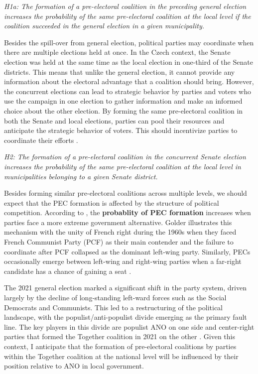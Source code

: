\documentclass[]{interact}
\theoremstyle{plain}%
\theoremstyle{definition}
\theoremstyle{remark}
\begin{document}
\vspace{12pt}
\textit{H1a: The formation of a pre-electoral coalition in the preceding general election increases the probability of the same pre-electoral coalition at the local level if the coalition succeeded in the general election in a given municipality.\label{hyp:1.1}}
\vspace{12pt}

Besides the spill-over from general election, political parties may coordinate when there are multiple elections held at once. In the Czech context, the Senate election was held at the same time as the local election in one-third of the Senate districts. This means that unlike the general election, it cannot provide any information about the electoral advantage that a coalition should bring. However, the concurrent elections can lead to strategic behavior by parties and voters who use the campaign in one election to gather information and make an informed choice about the other election. By forming the same pre-electoral coalition in both the Senate and local elections, parties can pool their resources and anticipate the strategic behavior of voters. This should incentivize parties to coordinate their efforts \citep{hicken2011}. 

\vspace{12pt}
\textit{H2: The formation of a pre-electoral coalition in the concurrent Senate election increases the probability of the same pre-electoral coalition at the local level in municipalities belonging to a given Senate district.\label{hyp:2}}
\vspace{12pt}

Besides forming similar pre-electoral coalitions across multiple levels, we should expect that the PEC formation is affected by the structure of political competition. 
According to \citet{golder2006}, the \textbf{probablity of PEC formation} increases when parties face a more extreme government alternative. Golder illustrates this mechanism with the unity of French right during the 1960s when they faced French Communist Party (PCF) as their main contender and the failure to coordinate after PCF collapsed as the dominant left-wing party. Similarly, PECs occasionally emerge between left-wing and right-wing parties when a far-right candidate has a chance of gaining a seat \citep[73]{golder2006}. 

The 2021 general election marked a significant shift in the party system, driven largely by the decline of long-standing left-ward forces such as the Social Democrats and Communists. This led to a restructuring of the political landscape, with the populist/anti-populist divide emerging as the primary fault line. The key players in this
divide are populist ANO on one side and center-right parties that formed the Together coalition in 2021 on the other \citep{havlik2022}. Given this context, I anticipate that the formation of pre-electoral coalitions by parties within the Together coalition at the national level will be influenced by their position relative to ANO in local government.
\end{document}
